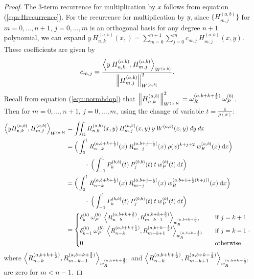 \documentclass[11pt, oneside]{article}   	%
\newcommand{\half}{\frac{1}{2}}
\newcommand{\hdop}{H}
\newcommand{\hdopnkab}{\hdop_{n,k}^{(a,b)}}
\newcommand{\Wab}{{W^{(a,b)}}}
\newcommand{\hdopmjab}{\hdop_{m,j}^{(a,b)}}
\newcommand{\genjac}{R}
\newcommand{\genjacnmk}{\genjac_{n-k}}
\newcommand{\genjacmmj}{\genjac_{m-j}}
\newcommand{\genjacw}{w_\genjac}
\newcommand{\normgenjac}{\omega_\genjac}
\newcommand{\normjac}{\omega_P}
\begin{document}
\begin{proof}
The 3-term recurrence for multiplication by $x$ follows from equation (\ref{eqn:Hrecurrence}). For the recurrence for multiplication by $y$, since $\{\hdopmjab\}$ for $m = 0,\dots,n+1$, $j = 0,\dots,m$ is an orthogonal basis for any degree $n+1$ polynomial, we can expand $y \: \hdopnkab(x,) = \sum_{m=0}^{n+1} \sum_{j=0}^m c_{m,j} \: \hdopmjab(x,y)$. These coefficients are given by
\begin{align*}
	c_{m,j} = \frac{\ip< y \: \hdopnkab, \hdopmjab >_{\Wab}}{\norm{\hdopmjab}^2_{\Wab}}.
\end{align*}
Recall from equation (\ref{eqn:normhdop}) that $\norm{\hdopnkab}_{\Wab}^2 = \normgenjac^{(a,b+k+\half)} \: \normjac^{(b)}$. Then for $m = 0,\dots,n+1$, $j = 0,\dots,m$, using the change of variable $t = \frac{y}{\rho(x)}$:
\begin{align*}
	\ip<y \hdopnkab, \hdopmjab>_\Wab &=  \iint_\Omega \hdopnkab(x,y) \: \hdopmjab(x,y) \: y \: \Wab(x,y) \: dy \: dx \\
	&= \Big( \int^1_0 \genjacnmk^{(a, b+k+\half)}(x) \: \genjacmmj^{(a, b+j+\half)}(x) \: \rho(x)^{k+j+2} \: \genjacw^{(a, b)}(x) \: \D x \Big) \nonumber \\
	& \quad \quad \quad\cdot \: \Big( \int^1_{-1} P_k^{(b,b)}(t) \: P_j^{(b,b)}(t) \: t \: w_P^{(b)}(t) \: \D t \Big) \\
	&= \Big( \int^1_0 \genjacnmk^{(a, b+k+\half)}(x) \: \genjacmmj^{(a, b+j+\half)}(x) \: \genjacw^{(a, b+1+\half(k+j))}(x) \: \D x \Big) \nonumber \\
	& \quad \quad \quad\cdot \: \Big( \int^1_{-1} P_k^{(b,b)}(t) \: P_j^{(b,b)}(t) \: t \: w_P^{(b)}(t) \: \D t \Big) \\
	&= 
	\begin{cases}
    		\delta_k^{(b)} \: \normjac^{(b)} \: \ip<\genjacnmk^{(a, b+k+\half)}, \genjac_{m-k-1}^{(a, b+k+\frac{3}{2})}>_{\genjacw^{(a, b+k+\frac{3}{2})}} \quad& \text{if } j = k+1 \\
		\delta_{k-1}^{(b)} \: \normjac^{(b)} \: \ip<\genjacnmk^{(a, b+k+\half)}, \genjac_{m-k+1}^{(a, b+k-\half)}>_{\genjacw^{(a, b+k+\half)}} \quad& \text{if } j = k-1 \\
		0 & \text{otherwise}
      	\end{cases}.
\end{align*}
where $\ip<\genjacnmk^{(a, b+k+\half)}, \genjac_{m-k-1}^{(a, b+k+\frac{3}{2})}>_{\genjacw^{(a, b+k+\frac{3}{2})}}$ and $\ip<\genjacnmk^{(a, b+k+\half)}, \genjac_{m-k+1}^{(a, b+k-\half)}>_{\genjacw^{(a, b+k+\half)}}$ are zero for $m < n-1$.

\end{proof}
\end{document}
